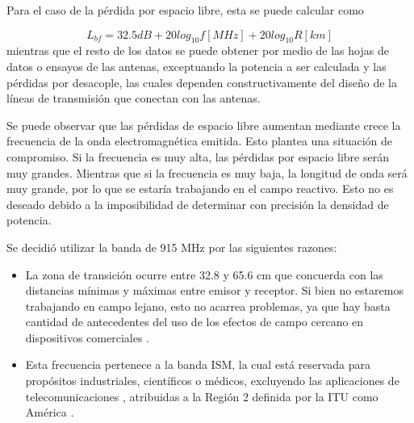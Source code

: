 Para el caso de la pérdida por espacio libre, esta se puede calcular como

\begin{equation}
L_{bf} = 32.5dB + 20log_{10}f[MHz]+20log_{10}R[km]
\end{equation}
mientras que el resto de los datos se puede obtener por medio de las hojas de datos o ensayos de las antenas, exceptuando la potencia a ser calculada y las pérdidas por desacople, las cuales dependen constructivamente del diseño de la líneas de transmisión que conectan con las antenas.


Se puede observar que las pérdidas de espacio libre aumentan mediante crece la frecuencia de la onda electromagnética emitida. Esto plantea una situación de compromiso. Si la frecuencia es muy alta, las pérdidas por espacio libre serán muy grandes. Mientras que si la frecuencia es muy baja, la longitud de onda será muy grande, por lo que se estaría trabajando en el campo reactivo. Esto no es deseado debido a la imposibilidad de determinar con precisión la densidad de potencia.

Se decidió utilizar la banda de 915 MHz por las siguientes razones:
\begin{itemize}
\item La zona de transición ocurre entre 32.8 y 65.6 cm que concuerda con las distancias mínimas y máximas entre emisor y receptor. Si bien no estaremos trabajando en campo lejano, esto no acarrea problemas, ya que hay basta cantidad de antecedentes del uso de los efectos de campo cercano en dispositivos comerciales \cite{ref:NearFieldUHFRFID} \cite{ref:Humavox}.
\item Esta frecuencia pertenece a la banda ISM, la cual está reservada para propósitos industriales, científicos o médicos, excluyendo las aplicaciones de telecomunicaciones \cite{ref:ITUISM}, atribuidas a la Región 2 definida por la ITU como América \cite{ref:ITUREGION}.
\end{itemize}
 


